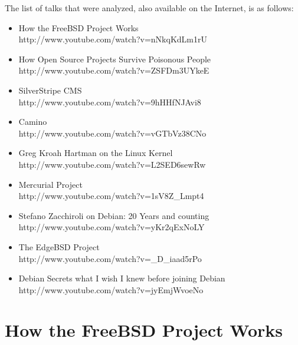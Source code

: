 \documentclass[11pt]{article} %
\begin{document}
The list of talks that were analyzed, also available on the Internet, is as follows:

\begin{itemize}
  \item How the FreeBSD Project Works\\
  		http://www.youtube.com/watch?v=nNkqKdLm1rU
  \item How Open Source Projects Survive Poisonous People\\
  		http://www.youtube.com/watch?v=ZSFDm3UYkeE
  \item SilverStripe CMS\\
  		http://www.youtube.com/watch?v=9hHHfNJAvi8
  \item Camino\\
  		http://www.youtube.com/watch?v=vGTbVz38CNo
  \item Greg Kroah Hartman on the Linux Kernel\\
  		http://www.youtube.com/watch?v=L2SED6sewRw
  \item Mercurial Project\\
  		http://www.youtube.com/watch?v=1sV8Z\_Lmpt4
  \item Stefano Zacchiroli on Debian: 20 Years and counting\\
  		http://www.youtube.com/watch?v=yKr2qExNoLY
  \item The EdgeBSD Project\\
  		http://www.youtube.com/watch?v=\_D\_iaad5rPo
  \item Debian Secrets what I wish I knew before joining Debian\\
  		http://www.youtube.com/watch?v=jyEmjWvoeNo
\end{itemize}

\newpage





\section{How the FreeBSD Project Works}
\end{document}
